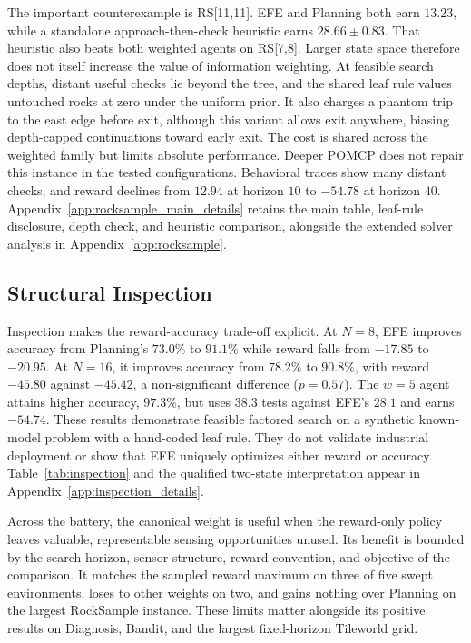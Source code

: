 The important counterexample is RS[11,11]. EFE and Planning both earn $13.23$, while a standalone approach-then-check heuristic earns $28.66\pm0.83$. That heuristic also beats both weighted agents on RS[7,8]. Larger state space therefore does not itself increase the value of information weighting. At feasible search depths, distant useful checks lie beyond the tree, and the shared leaf rule values untouched rocks at zero under the uniform prior. It also charges a phantom trip to the east edge before exit, although this variant allows exit anywhere, biasing depth-capped continuations toward early exit. The cost is shared across the weighted family but limits absolute performance. Deeper POMCP does not repair this instance in the tested configurations. Behavioral traces show many distant checks, and reward declines from $12.94$ at horizon $10$ to $-54.78$ at horizon $40$. Appendix~\ref{app:rocksample_main_details} retains the main table, leaf-rule disclosure, depth check, and heuristic comparison, alongside the extended solver analysis in Appendix~\ref{app:rocksample}.

\subsection{Structural Inspection}
\label{sec:inspection}

Inspection makes the reward-accuracy trade-off explicit. At $N{=}8$, EFE improves accuracy from Planning's $73.0\%$ to $91.1\%$ while reward falls from $-17.85$ to $-20.95$. At $N{=}16$, it improves accuracy from $78.2\%$ to $90.8\%$, with reward $-45.80$ against $-45.42$, a non-significant difference ($p=0.57$). The $w{=}5$ agent attains higher accuracy, $97.3\%$, but uses $38.3$ tests against EFE's $28.1$ and earns $-54.74$. These results demonstrate feasible factored search on a synthetic known-model problem with a hand-coded leaf rule. They do not validate industrial deployment or show that EFE uniquely optimizes either reward or accuracy. Table~\ref{tab:inspection} and the qualified two-state interpretation appear in Appendix~\ref{app:inspection_details}.

Across the battery, the canonical weight is useful when the reward-only policy leaves valuable, representable sensing opportunities unused. Its benefit is bounded by the search horizon, sensor structure, reward convention, and objective of the comparison. It matches the sampled reward maximum on three of five swept environments, loses to other weights on two, and gains nothing over Planning on the largest RockSample instance. These limits matter alongside its positive results on Diagnosis, Bandit, and the largest fixed-horizon Tileworld grid.
